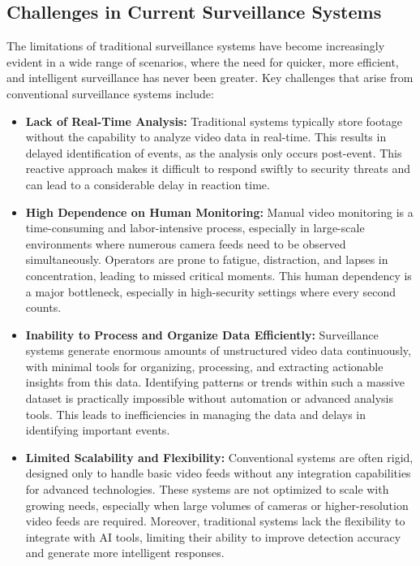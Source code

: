\documentclass[12pt]{report}
\begin{document}
\subsection{Challenges in Current Surveillance Systems}
The limitations of traditional surveillance systems have become increasingly evident in a wide range of scenarios, where the need for quicker, more efficient, and intelligent surveillance has never been greater. Key challenges that arise from conventional surveillance systems include:

\begin{itemize}[leftmargin=*, nosep]
    \item \textbf{Lack of Real-Time Analysis:} Traditional systems typically store footage without the capability to analyze video data in real-time. This results in delayed identification of events, as the analysis only occurs post-event. This reactive approach makes it difficult to respond swiftly to security threats and can lead to a considerable delay in reaction time.
    
    \item \textbf{High Dependence on Human Monitoring:} Manual video monitoring is a time-consuming and labor-intensive process, especially in large-scale environments where numerous camera feeds need to be observed simultaneously. Operators are prone to fatigue, distraction, and lapses in concentration, leading to missed critical moments. This human dependency is a major bottleneck, especially in high-security settings where every second counts.
    
    \item \textbf{Inability to Process and Organize Data Efficiently:} Surveillance systems generate enormous amounts of unstructured video data continuously, with minimal tools for organizing, processing, and extracting actionable insights from this data. Identifying patterns or trends within such a massive dataset is practically impossible without automation or advanced analysis tools. This leads to inefficiencies in managing the data and delays in identifying important events.
    
    \item \textbf{Limited Scalability and Flexibility:} Conventional systems are often rigid, designed only to handle basic video feeds without any integration capabilities for advanced technologies. These systems are not optimized to scale with growing needs, especially when large volumes of cameras or higher-resolution video feeds are required. Moreover, traditional systems lack the flexibility to integrate with AI tools, limiting their ability to improve detection accuracy and generate more intelligent responses.
    

\end{itemize}
\end{document}
